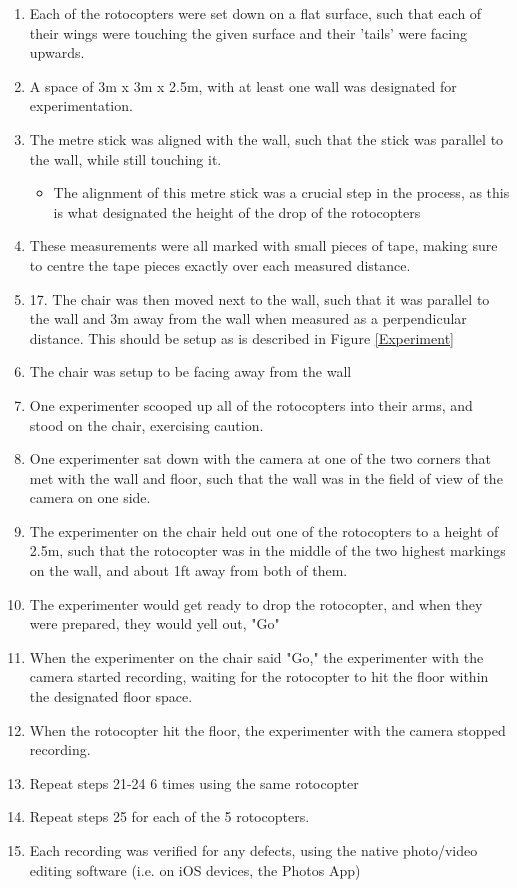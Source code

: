 \documentclass[]{article}
\theoremstyle{definition}
\begin{document}
\begin{enumerate}
\begin{itemize}
    \end{itemize}
    \item Each of the rotocopters were set down on a flat surface, such that each of their wings were touching the given surface and their 'tails' were facing upwards.
    \item A space of 3m x 3m x 2.5m, with at least one wall was designated for experimentation.
    \item The metre stick was aligned with the wall, such that the stick was parallel to the wall, while still touching it.
    \begin{itemize}
        \item The alignment of this metre stick was a crucial step in the process, as this is what designated the height of the drop of the rotocopters
    \end{itemize}
    \item These measurements were all marked with small pieces of tape, making sure to centre the tape pieces exactly over each measured distance.
    \item 17. The chair was then moved next to the wall, such that it was parallel to the wall and 3m away from the wall when measured as a perpendicular distance. This should be setup as is described in Figure \ref{Experiment}
    \item The chair was setup to be facing away from the wall
    \item One experimenter scooped up all of the rotocopters into their arms, and stood on the chair, exercising caution.
    \item One experimenter sat down with the camera at one of the two corners that met with the wall and floor, such that the wall was in the field of view of the camera on one side.
    \item The experimenter on the chair held out one of the rotocopters to a height of 2.5m, such that the rotocopter was in the middle of the two highest markings on the wall, and about 1ft away from both of them.
    \item The experimenter would get ready to drop the rotocopter, and when they were prepared, they would yell out, "Go"
    \item When the experimenter on the chair said "Go," the experimenter with the camera started recording, waiting for the rotocopter to hit the floor within the designated floor space.
    \item When the rotocopter hit the floor, the experimenter with the camera stopped recording.
    \item Repeat steps 21-24 6 times using the same rotocopter
    \item Repeat steps 25 for each of the 5 rotocopters.
    \item Each recording was verified for any defects, using the native photo/video editing software (i.e. on iOS devices, the Photos App)
\end{enumerate}
\end{document}
